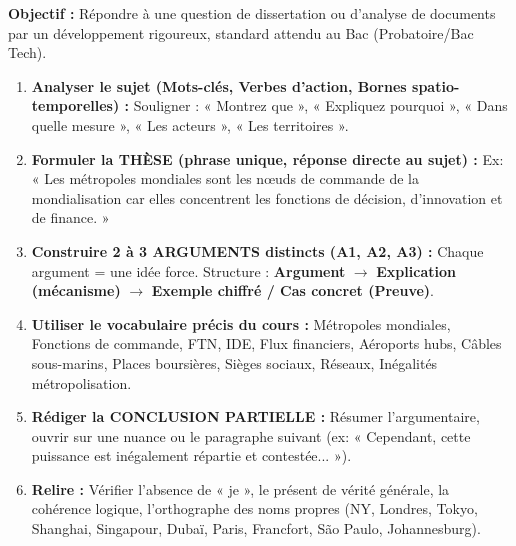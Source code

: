 \documentclass[11pt]{article}
\newcommand{\cle}[1]{{\popxbold\color{popdark}#1}}
\begin{document}
\begin{methode}
    \textbf{Objectif :} Répondre à une question de dissertation ou d'analyse de documents par un développement rigoureux, standard attendu au Bac (Probatoire/Bac Tech).
    \begin{enumerate}
        \item \textbf{Analyser le sujet (Mots-clés, Verbes d'action, Bornes spatio-temporelles) :} Souligner : « Montrez que », « Expliquez pourquoi », « Dans quelle mesure », « Les acteurs », « Les territoires ».
        \item \textbf{Formuler la THÈSE (phrase unique, réponse directe au sujet) :} Ex: « Les métropoles mondiales sont les nœuds de commande de la mondialisation car elles concentrent les fonctions de décision, d'innovation et de finance. »
        \item \textbf{Construire 2 à 3 ARGUMENTS distincts (A1, A2, A3) :} Chaque argument = une idée force. Structure : \textbf{Argument} $\rightarrow$ \textbf{Explication (mécanisme)} $\rightarrow$ \textbf{Exemple chiffré / Cas concret (Preuve)}.
        \item \textbf{Utiliser le vocabulaire précis du cours :} \cle{Métropoles mondiales}, \cle{Fonctions de commande}, \cle{FTN}, \cle{IDE}, \cle{Flux financiers}, \cle{Aéroports hubs}, \cle{Câbles sous-marins}, \cle{Places boursières}, \cle{Sièges sociaux}, \cle{Réseaux}, \cle{Inégalités métropolisation}.
        \item \textbf{Rédiger la CONCLUSION PARTIELLE :} Résumer l'argumentaire, ouvrir sur une nuance ou le paragraphe suivant (ex: « Cependant, cette puissance est inégalement répartie et contestée... »).
        \item \textbf{Relire :} Vérifier l'absence de « je », le présent de vérité générale, la cohérence logique, l'orthographe des noms propres (NY, Londres, Tokyo, Shanghai, Singapour, Dubaï, Paris, Francfort, São Paulo, Johannesburg).
    \end{enumerate}
\end{methode}
\end{document}
